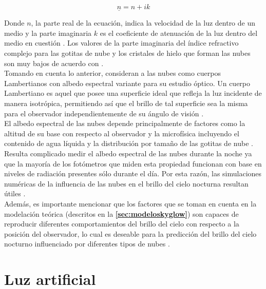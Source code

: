 \begin{equation}
\underline{n} = n + i k
\end{equation}

\vspace{2mm} 

Donde $n$, la parte real de la ecuación, indica la velocidad de la luz dentro de un medio y la parte imaginaria $k$ es el coeficiente de atenuación de la luz dentro del medio en cuestión \citep{Born&Wolf2003}. Los valores de la parte imaginaria del índice refractivo complejo para las gotitas de nube y los cristales de hielo que forman las nubes son muy bajos de acuerdo con \cite{Solano2015}.\\

Tomando en cuenta lo anterior, \cite{Solano2015} consideran a las nubes como cuerpos Lambertianos con albedo espectral variante para su estudio óptico. Un cuerpo Lambertiano es aquel que posee una superficie ideal que refleja la luz incidente de manera isotrópica, permitiendo así que el brillo de tal superficie sea la misma para el observador independientemente de su ángulo de visión \citep{Born&Wolf2003}.\\

El albedo espectral de las nubes depende principalmente de factores como la altitud de su base con respecto al observador y la microfísica incluyendo el contenido de agua líquida y la distribución por tamaño de las gotitas de nube \citep{Kocifaj2007}.\\ 

Resulta complicado medir el albedo espectral de las nubes durante la noche ya que la mayoría de los fotómetros que miden esta propiedad funcionan con base en niveles de radiación presentes sólo durante el día. Por esta razón, las simulaciones numéricas de la influencia de las nubes en el brillo del cielo nocturna resultan útiles \citep{Solano2015}.\\

Además, es importante mencionar que los factores que se toman en cuenta en la modelación teórica (descritos en la \textbf{\autoref{sec:modeloskyglow}}) son capaces de reproducir diferentes comportamientos del brillo del cielo con respecto a la posición del observador, lo cual es deseable para la predicción del brillo del cielo nocturno influenciado por diferentes tipos de nubes \citep{Kocifaj2007,Solano2015}.

\newpage

\section{Luz artificial}\\
\label{sec:luzartificial}

